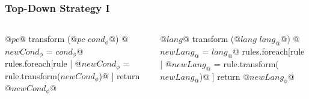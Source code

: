 \documentclass{beamer}
\makeatletter
\newcommand{\id}[1]{\ensuremath{#1}}
\newcommand{\type}[1]{\id{#1}}
\newcommand{\pc}  [1]{\ensuremath{{\id{#1}}_\phi}}
\newcommand{\lang}[1]{\ensuremath{{\id{#1}}_@}}
\makeatother
\begin{document}
\begin{frame}[fragile]
\frametitle{Top-Down Strategy I}
	
	\begin{columns}
	
	
	\begin{PseudoCode}
@\type{pc}@ transform (@\type{pc} \pc{cond}@)
  @\pc{newCond} = \pc{cond}@
  rules.foreach[rule |
    @\pc{newCond} = rule.transform(\pc{newCond})@
  ]
  return @\pc{newCond}@
	\end{PseudoCode}


	\begin{PseudoCode}
@\type{lang}@ transform (@\type{lang} \lang{lang}@)
  @\lang{newLang} = \lang{lang}@
  rules.foreach[rule |
    @\lang{newLang} = rule.transform(\lang{newLang})@
  ]
  return @\pc{newLang}@
	\end{PseudoCode}
	
	\end{columns}
	
\end{frame}
\end{document}
